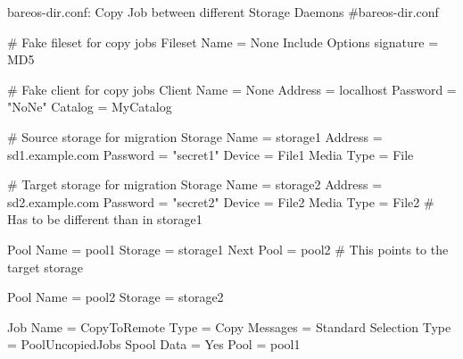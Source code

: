 \begin{bconfig}{bareos-dir.conf: Copy Job between different Storage Daemons}
#bareos-dir.conf

# Fake fileset for copy jobs
Fileset {
  Name = None
  Include {
    Options {
      signature = MD5
    }
  }
}

# Fake client for copy jobs
Client {
  Name = None
  Address = localhost
  Password = "NoNe"
  Catalog = MyCatalog
}

# Source storage for migration
Storage {
   Name = storage1
   Address = sd1.example.com
   Password = "secret1"
   Device = File1
   Media Type = File
}

# Target storage for migration
Storage {
   Name = storage2
   Address = sd2.example.com
   Password = "secret2"
   Device = File2
   Media Type = File2   # Has to be different than in storage1
}

Pool {
   Name = pool1
   Storage = storage1
   Next Pool = pool2    # This points to the target storage
}

Pool {
   Name = pool2
   Storage = storage2
}

Job {
   Name = CopyToRemote
   Type = Copy
   Messages = Standard
   Selection Type = PoolUncopiedJobs
   Spool Data = Yes
   Pool = pool1
}
\end{bconfig}
